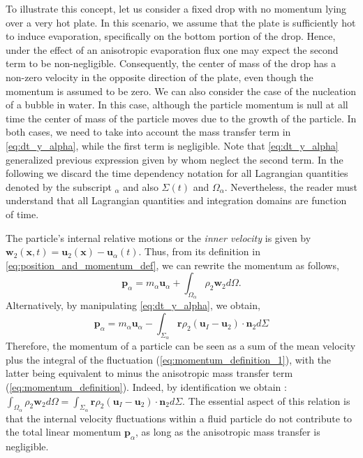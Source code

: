 To illustrate this concept, let us consider a fixed drop with no momentum lying over a very hot plate.
In this scenario, we assume that the plate is sufficiently hot to induce evaporation, specifically on the bottom portion of the drop.
Hence, under the effect of an anisotropic evaporation flux one may expect the second term to be non-negligible.
Consequently, the center of mass of the drop has a non-zero velocity in the opposite direction of the plate, even though the momentum is assumed to be zero.
We can also consider the case of the nucleation of a bubble in water. 
In this case, although the particle momentum is null at all time the center of mass of the particle moves due to the growth of the particle. 
In both cases, we need to take into account the mass transfer term in \ref{eq:dt_y_alpha}, while the first term is negligible. 
Note that \ref{eq:dt_y_alpha} generalized previous expression given by \citet{morel2015mathematical} whom neglect the second term.
In the following we discard the time dependency notation for all Lagrangian quantities denoted by the subscript $_\alpha$ and also $\Sigma(t)$ and $\Omega_\alpha$.
Nevertheless, the reader must understand that all Lagrangian quantities and integration domains are function of time. 

The particle's internal relative motions or the \textit{inner velocity} is given by $\textbf{w}_2(\textbf{x},t) = \textbf{u}_2(\textbf{x}) - \textbf{u}_\alpha(t)$.
Thus, from its definition in \ref{eq:position_and_momentum_def}, we can rewrite the momentum as follows,
\begin{equation}
    \label{eq:momentum_definition_1}
    \textbf{p}_\alpha
    = m_\alpha \textbf{u}_\alpha
    + \int_{\Omega_\alpha} \rho_2 \textbf{w}_2 d\Omega.
\end{equation}
Alternatively, by manipulating \ref{eq:dt_y_alpha}, we obtain,
\begin{equation}
    \textbf{p}_\alpha
    =  m_\alpha \textbf{u}_\alpha
    - \int_{\Sigma_\alpha} \textbf{r} \rho_2 (\textbf{u}_I - \textbf{u}_2)\cdot \textbf{n}_2 d\Sigma
    \label{eq:momentum_definition}
\end{equation}
Therefore, the momentum of a particle can be seen as a sum of the mean velocity plus the integral of the fluctuation (\ref{eq:momentum_definition_1}), with the latter being equivalent to minus the anisotropic mass transfer term (\ref{eq:momentum_definition}).
Indeed, by identification we obtain : $\int_{\Omega_\alpha} \rho_2 \textbf{w}_2 d\Omega =\int_{\Sigma_\alpha} \textbf{r} \rho_2 (\textbf{u}_I - \textbf{u}_2)\cdot \textbf{n}_2 d\Sigma$. 
The essential aspect of this relation is that the internal velocity fluctuations within a fluid particle do not contribute to the total linear momentum $\textbf{p}_\alpha$, as long as the anisotropic mass transfer is negligible.  


